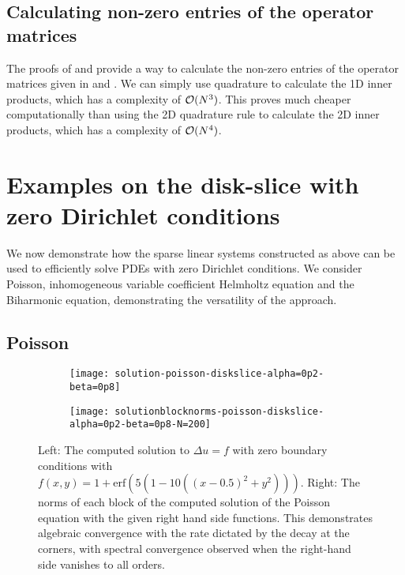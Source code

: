 \subsection{Calculating non-zero entries of the operator matrices}\label{subsection:Computation-operatormatrices}

The proofs of  and  provide a way to calculate the non-zero entries of the operator matrices given in  and . We can simply use quadrature to calculate the 1D inner products, which has a complexity of $\mathcal{O}(N^3)$. This proves much cheaper computationally than using the 2D quadrature rule to calculate the 2D inner products, which has a complexity of $\mathcal{O}(N^4)$. 


%
\section{Examples on the disk-slice with zero Dirichlet conditions}\label{Section:Examples}

We now demonstrate how the sparse linear systems constructed as above can be used to efficiently solve PDEs with zero Dirichlet conditions. We consider Poisson, inhomogeneous variable coefficient Helmholtz equation and the Biharmonic equation, demonstrating the versatility of the approach. 

\subsection{Poisson}

\begin{figure}[t]
	\begin{subfigure}{0.3\textwidth}
		\texttt{[image: solution-poisson-diskslice-alpha=0p2-beta=0p8]}
		\centering
	\end{subfigure}
	\begin{subfigure}{0.5\textwidth}
		\centering
		\texttt{[image: solutionblocknorms-poisson-diskslice-alpha=0p2-beta=0p8-N=200]}
	\end{subfigure}
	\caption{Left: The computed solution to $\Delta u = f$ with zero boundary conditions with $f(x,y) = 1 + \text{erf}(5(1 - 10((x - 0.5)^2 + y^2)))$. Right: The norms of each block of the computed solution of the Poisson equation with the given right hand side functions. This demonstrates algebraic convergence with the rate dictated by the decay at the corners, with spectral convergence observed when the right-hand side vanishes to all orders.}
	\centering
	\label{fig:ds:poisson}
\end{figure}

